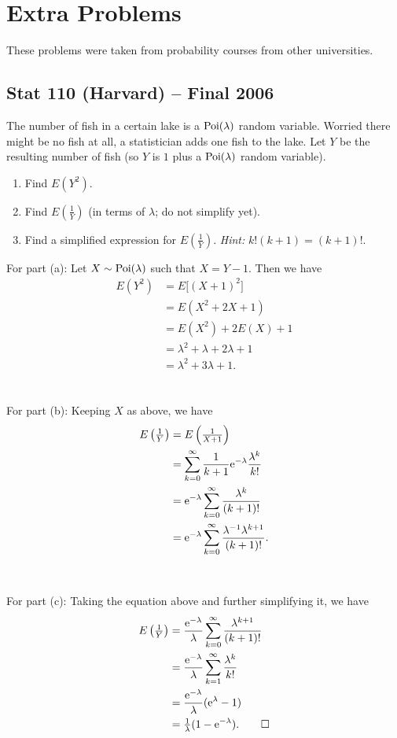 \section{Extra Problems}
These problems were taken from probability courses from other
universities.
\subsection{Stat 110 (Harvard) -- Final 2006}
\begin{problem}
  The number of fish in a certain lake is a \(\operatorname{Poi}(\lambda)\) random
  variable. Worried there might be no fish at all, a statistician adds one
  fish to the lake. Let \(Y\) be the resulting number of fish (so \(Y\) is
  \(1\) plus a \(\operatorname{Poi}(\lambda)\) random variable).
  \begin{enumerate}[label=(\alph*),noitemsep]
  \item Find \(E(Y^2)\).
  \item Find \(E(\frac{1}{Y})\) (in terms of \(\lambda\); do not simplify
    yet).
  \item Find a simplified expression for \(E(\frac{1}{Y})\). \emph{Hint:}
    \(k!(k+1)=(k+1)!\).
  \end{enumerate}
\end{problem}
\begin{solution*}
  For part (a): Let \(X\sim\operatorname{Poi}(\lambda)\) such that \(X=Y-1\). Then we
  have
  \begin{align*}
    E(Y^2)
    &=E\bigl[(X+1)^2\bigr]\\
    &=E(X^2+2X+1)\\
    &=E(X^2)+2E(X)+1\\
    &=\lambda^2+\lambda+2\lambda+1\\
    &=\lambda^2+3\lambda+1.
  \end{align*}
  \\\\
  For part (b): Keeping \(X\) as above, we have
  \begin{align*}
    E\left(\tfrac{1}{Y}\right)
    &=E\left(\tfrac{1}{X+1}\right)\\
    &=\sum_{k=0}^\infty \frac{1}{k+1}\mathrm{e}^{-\lambda}\frac{\lambda^k}{k!}\\
    &=\mathrm{e}^{-\lambda}\sum_{k=0}^\infty\frac{\lambda^k}{(k+1)!}\\
    &=\mathrm{e}^{-\lambda}\sum_{k=0}^\infty\frac{\lambda^{-1}\lambda^{k+1}}{(k+1)!}.
  \end{align*}
  \\\\
  For part (c): Taking the equation above and further simplifying it, we
  have
  \begin{align*}
    E\left( \tfrac{1}{Y} \right)
    &=\frac{\mathrm{e}^{-\lambda}}{\lambda}
      \sum_{k=0}^\infty\frac{\lambda^{k+1}}{(k+1)!}\\
    &=\frac{\mathrm{e}^{-\lambda}}{\lambda}
      \sum_{k=1}^\infty\frac{\lambda^k}{k!}\\
    &=\frac{\mathrm{e}^{-\lambda}}{\lambda}(\mathrm{e}^{\lambda}-1)\\
    &=\tfrac{1}{\lambda}(1-\mathrm{e}^{-\lambda}).\qedhere
  \end{align*}
\end{solution*}

